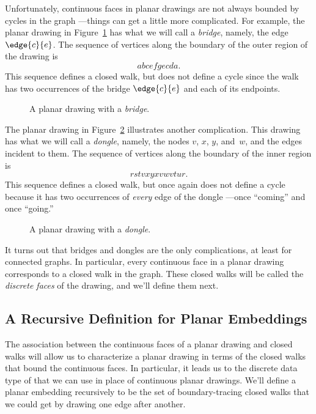 Unfortunately, continuous faces in planar drawings are not always
bounded by cycles in the graph ---things can get a little more
complicated.  For example, the planar drawing in
Figure~\ref{fig:bridge} has what we will call a \emph{bridge}, namely,
the edge $\edge{c}{e}$.  The sequence of vertices along the boundary
of the outer region of the drawing is
\[
abcefgecda.
\]
This sequence defines a closed walk, but does not define a cycle since
the walk has two occurrences of the bridge $\edge{c}{e}$ and each of
its endpoints.

\begin{figure}


\caption{A planar drawing with a \emph{bridge}.}
\label{fig:bridge}
\end{figure}

The planar drawing in Figure~\ref{fig:dongle} illustrates another
complication.  This drawing has what we will call a \emph{dongle},
namely, the nodes $v$, $x$, $y$, and~$w$, and the edges incident to
them.  The sequence of vertices along the boundary
of the inner region is
\[
rstvxyxvwvtur.
\]
This sequence defines a closed walk, but once again does not define a
cycle because it has two occurrences of \emph{every} edge of the
dongle ---once ``coming'' and once ``going.''

\begin{figure}


\caption{A planar drawing with a \emph{dongle}.}
\label{fig:dongle}
\end{figure}

It turns out that bridges and dongles are the only complications, at least
for connected graphs.  In particular, every continuous face in a planar
drawing corresponds to a closed walk in the graph.  These closed walks
will be called the \emph{discrete faces} of the drawing, and we'll define
them next.

\subsection{A Recursive Definition for Planar Embeddings}

The association between the continuous faces of a planar drawing and
closed walks will allow us to characterize a planar drawing in terms
of the closed walks that bound the continuous faces.  In particular,
it leads us to the discrete data type of 
that we can use in place of continuous planar drawings.  
We'll define a planar embedding recursively to be the set of
boundary-tracing closed walks that we could get by drawing one edge
after another.

